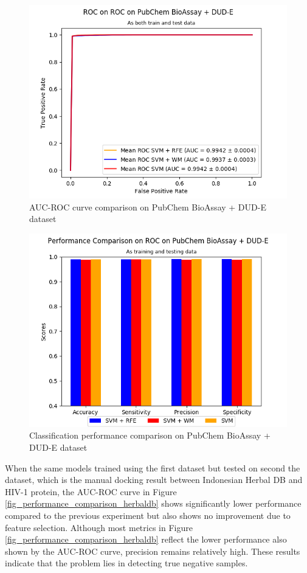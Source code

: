 \documentclass[conference]{IEEEtran}
\begin{document}
\begin{figure}
	\includegraphics[scale=0.5]{../images/03-evaluate-1_roc_chart.png}
	\caption{AUC-ROC curve comparison on PubChem BioAssay + DUD-E dataset}
	\label{fig_roc_comparison_pubchem}
\end{figure}

\begin{figure}
	\includegraphics[scale=0.5]{../images/03-evaluate-1_scores_chart.png}
	\caption{Classification performance comparison on PubChem BioAssay + DUD-E dataset}
	\label{fig_performance_comparison_pubchem}
\end{figure}

When the same models trained using the first dataset but tested on second the dataset, which is the manual docking result between Indonesian Herbal DB and HIV-1 protein, the AUC-ROC curve in Figure \ref{fig_performance_comparison_herbaldb} shows significantly lower performance compared to the previous experiment but also shows no improvement due to feature selection. Although most metrics in Figure \ref{fig_performance_comparison_herbaldb} reflect the lower performance also shown by the AUC-ROC curve, precision remains relatively high. These results indicate that the problem lies in detecting true negative samples.
\end{document}
